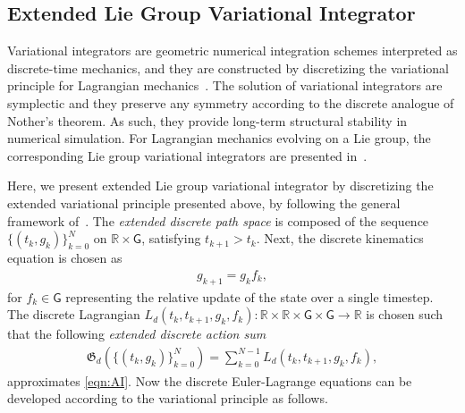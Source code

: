 \documentclass[letterpaper, 10pt, conference]{ieeeconf}
\newcommand{\G}{\ensuremath{\mathsf{G}}}
\renewcommand{\Re}{\ensuremath{\mathbb{R}}}
\begin{document}
\subsection{Extended Lie Group Variational Integrator}

Variational integrators are geometric numerical integration schemes interpreted as discrete-time mechanics, and they are constructed by discretizing the variational principle for Lagrangian mechanics~\cite{MarWesAN01}.
The solution of variational integrators are symplectic and they preserve any symmetry according to the discrete analogue of Nother's theorem.
As such, they provide long-term structural stability in numerical simulation. 
For Lagrangian mechanics evolving on a Lie group, the corresponding Lie group variational integrators are presented in~\cite{Leo04,Lee08,LeeLeoCMAME07}.

Here, we present extended Lie group variational integrator by discretizing the extended variational principle presented above, by following the general framework of~\cite{MarWesAN01}.
The \textit{extended discrete path space} is composed of the sequence $\{(t_k, g_k)\}_{k=0}^N$ on $\Re\times\G$, satisfying $t_{k+1}>t_k$.
Next, the discrete kinematics equation is chosen as
\begin{align}
    g_{k+1} = g_k f_k, \label{eqn:gkp}
\end{align}
for $f_k \in\G$ representing the relative update of the state over a single timestep. 
The discrete Lagrangian $L_d(t_k, t_{k+1}, g_k, f_k): \Re\times\Re\times\G\times\G\rightarrow \Re$ is chosen such that the following \textit{extended discrete action sum}
\begin{align}
    \mathfrak{G}_d(\{(t_k, g_k)\}_{k=0}^N) = \sum_{k=0}^{N-1} L_d(t_k, t_{k+1}, g_k, f_k), \label{eqn:Gd}
\end{align}
approximates \eqref{eqn:AI}. 
Now the discrete Euler-Lagrange equations can be developed according to the variational principle as follows.
\end{document}
